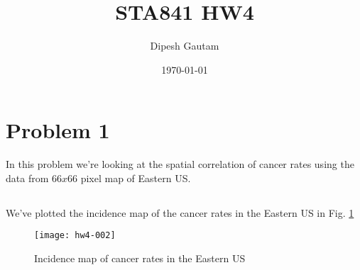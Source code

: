 \documentclass{article}
\begin{document}

\title{STA841 HW4}
\author{Dipesh Gautam}
\date{\today}
\maketitle


\section{Problem 1}
In this problem we're looking at the spatial correlation of cancer rates using the data from $66x66$ pixel map of Eastern US.
\subsection{}
We've plotted the incidence map of the cancer rates in the Eastern US in Fig. \ref{fig1}

\begin{figure}[H]
\centering
\texttt{[image: hw4-002]}
\caption{Incidence map of cancer rates in the Eastern US}
\label{fig1}
\end{figure}
\end{document}
